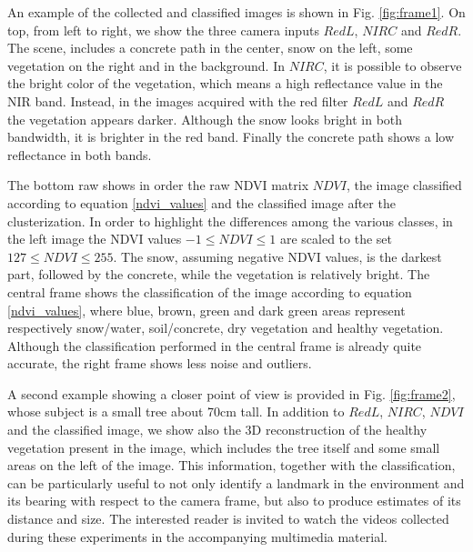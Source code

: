 \documentclass[a4paper, 10pt, conference]{ieeeconf}      %
\begin{document}

An example of the collected and classified images is shown in Fig. \ref{fig:frame1}.
On top, from left to right, we show the three camera inputs $RedL$, $NIRC$ and $RedR$.
The scene, includes a concrete path in the center, snow on the left, some vegetation on the right and in the background.
In $NIRC$, it is possible to observe the bright color of the vegetation, which means a high reflectance value in the NIR band.
Instead,  in the images acquired with the red filter $RedL$ and $RedR$ the vegetation appears darker.
Although the snow looks bright in both bandwidth, it is brighter in the red band.
Finally the concrete path shows a low reflectance in both bands.

The bottom raw shows in order the raw NDVI matrix $NDVI$, the image classified according to equation \eqref{ndvi_values} and the classified image after the clusterization.
In order to highlight the differences among the various classes, in the left image the NDVI values $-1 \leq NDVI \leq 1$ are scaled to the set $127 \leq  NDVI \leq 255$.
The snow, assuming negative NDVI values, is the darkest part, followed by the concrete, while the vegetation is relatively bright.
The central frame shows the classification of the image according to equation \eqref{ndvi_values}, where blue, brown, green and dark green areas represent respectively snow/water, soil/concrete, dry vegetation and healthy vegetation.
Although the classification performed in the central frame is already quite accurate, the right frame shows less noise and outliers.

A second example showing a closer point of view is provided in Fig. \ref{fig:frame2}, whose subject is a small tree about 70cm tall.
In addition to $RedL$, $NIRC$, $NDVI$ and the classified image, we show also the 3D reconstruction of the healthy vegetation present in the image, which includes the tree itself and some small areas on the left of the image.
This information, together with the classification, can be particularly useful to not only identify a landmark in the environment  and its bearing with respect to the camera frame, but also to produce  estimates of its distance and size.
The interested reader is invited to watch the videos collected during these experiments in the accompanying multimedia material.
\end{document}
